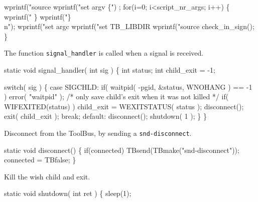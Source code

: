    wprintf("source %
   wprintf("set argv \{") ;
   for(i=0; i<script_nr_args; i++) \{
     wprintf("%
   \}
   wprintf("\}\\n");
   wprintf("set argc %
   wprintf("set TB_LIBDIR %
   wprintf("source %
   check_in_sign();
\}
\nwendcode{}\nwdocspar


The function {\tt signal\_handler} is called when a signal is
received.

\nwenddocs{}\endmoddef\let\nwnotused=\nwoutput{}
static void signal_handler( int sig )
\{
   int status;
   int child_exit = -1;

   switch( sig )
   \{
      case SIGCHLD:
         if( waitpid( -pgid, &status, WNOHANG ) == -1 )
            error( "waitpid" );
         /* only save child's exit when it was not killed */
         if( WIFEXITED(status) )
            child_exit = WEXITSTATUS( status );
         disconnect();
         exit( child_exit );
         break;
      default:
         disconnect();
         shutdown( 1 );
   \}
\}
\nwendcode{}\nwdocspar


Disconnect from the ToolBus, by sending a {\tt snd-disconnect}.

\nwenddocs{}\endmoddef\let\nwnotused=\nwoutput{}
static void disconnect()
\{
   if(connected)
      TBsend(TBmake("snd-disconnect"));
   connected = TBfalse;
\}
\nwendcode{}\nwdocspar


Kill the wish child and exit.

\nwenddocs{}\endmoddef\let\nwnotused=\nwoutput{}
static void shutdown( int ret )
\{
   sleep(1);
   
